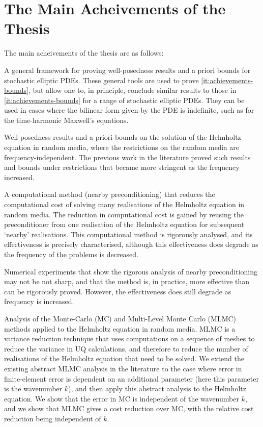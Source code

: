 \section{The Main Acheivements of the Thesis}

The main acheivements of the thesis are as follows:

\ben
\item A general framework for proving well-posedness results and a priori bounds for stochastic elliptic PDEs. These general tools are used to prove \cref{it:achievements-bounds}, but allow one to, in principle, conclude similar results to those in \cref{it:achievements-bounds} for a range of stochastic elliptic PDEs. They can be used in cases where the bilinear form given by the PDE is indefinite, such as for the time-harmonic Maxwell's equations.

\item\label{it:achievements-bounds} Well-posedness results and a priori bounds on the solution of the Helmholtz equation in random media, where the restrictions on the random media are frequency-independent. The previous work in the literature proved such results and bounds under restrictions that became more stringent as the frequency increased.

\item A computational method (nearby preconditioning) that reduces the computational cost of solving many realisations of the Helmholtz equation in random media. The reduction in computational cost is gained by reusing the preconditioner from one realisation of the Helmholtz equation for subsequent `nearby' realisations. This computational method is rigorously analysed, and its effectiveness is precisely characterised, although this effectiveness does degrade as the frequency of the problems is decreased.

\item Numerical experiments that show the rigorous analysis of nearby preconditioning may not be not sharp, and that the method is, in practice, more effective than can be rigorously proved. However, the effectiveness does still degrade as frequency is increased.

\item Analysis of the Monte-Carlo (MC) and Multi-Level Monte Carlo (MLMC) methods applied to the Helmholtz equation in random media. MLMC is a variance reduction technique that uses computations on a sequence of meshes to reduce the variance in UQ calculations, and therefore to reduce the number of realisations of the Helmholtz equation that need to be solved. We extend the existing abstract MLMC analysis in the literature to the case where error in finite-element error is dependent on an additional parameter (here this parameter is the wavenumber $k$), and then apply this abstract analysis to the Helmholtz equation. We show that the error in MC is independent of the wavenumber $k$, and we show that MLMC gives a cost reduction over MC, with the relative cost reduction being independent of $k.$

